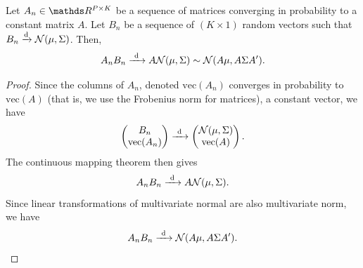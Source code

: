 \documentclass[letterpaper, 10pt]{article}
\begin{document}
\begin{proposition}
  Let \(A_n \in \RR^{P \times K}\) be a sequence of matrices converging in probability to a constant matrix \(A\).
  Let \(B_n\) be a sequence of \((K \times 1)\) random vectors such that \(B_n \xrightarrow{\mathrm{d}} \mathcal{N}(\mu, \Sigma)\).
  Then,
  \[
    A_n B_n \xrightarrow{\ \mathrm{d}\ } A \mathcal{N}(\mu, \Sigma) \sim \mathcal{N}(A \mu, A \Sigma A').
  \]
\end{proposition}
\begin{proof}
  Since the columns of \(A_n\), denoted \(\text{vec}(A_n)\) converges in probability to  \(\text{vec}(A)\) (that is, we use the Frobenius norm for matrices), a constant vector, we have
  \[
    \begin{pmatrix}
      B_n \\
      \text{vec}(A_n)
    \end{pmatrix}
    \xrightarrow{\ \mathrm{d}\ }
    \begin{pmatrix}
      \mathcal{N}(\mu, \Sigma) \\
      \text{vec}(A)
    \end{pmatrix}.
  \]
  The continuous mapping theorem then gives
  \[
    A_n B_n \xrightarrow{\ \mathrm{d}\ } A \mathcal{N}(\mu, \Sigma).
  \]
  Since linear transformations of multivariate normal are also multivariate norm, we have
  \[
    A_n B_n \xrightarrow{\ \mathrm{d}\ } \mathcal{N}(A \mu, A \Sigma A').
  \]
\end{proof}
\end{document}
